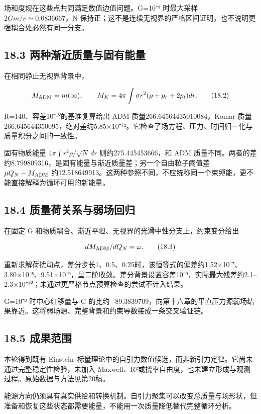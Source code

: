 \documentclass[UTF8,fontset=fandol,11pt]{ctexart}
\begin{document}
场和度规在这些点共同满足数值边值问题。G=10⁻³ 时最大采样 \(2Gm/r\simeq0.0836667\)，N 保持正；这不是连续无视界的严格区间证明，也不说明更强耦合处必然有同一分支。

\subsection*{18.3 两种渐近质量与固有能量}

在相同静止无视界背景中，

\[
M_{\rm ADM}=m(\infty),\qquad
M_K=4\pi\int\sigma r^2(\rho+p_r+2p_t)dr.
\tag{18.2}
\]

R=140、容差10⁻¹⁰的基准复算给出 ADM 质量266.64564435010084，Komar 质量266.645644350095，绝对差约5.85×10⁻¹²。它检查了场方程、压力、时间归一化与质量积分之间的一致性。

固有物质能量 \(4\pi\int r^2\rho/\sqrt N\,dr\) 则约275.445453666，和 ADM 质量不同。两者的差约8.799809316，是固有能量与渐近质量差；另一个自由粒子阈值差 \(\mu Q_N-M_{\rm ADM}\) 约12.518649913。这两种参照不同，不应统称同一个束缚能，更不能直接解释为循环可用的新能量。

\subsection*{18.4 质量荷关系与弱场回归}

在固定 G 和物质耦合、渐近平坦、无视界的光滑中性分支上，约束变分给出

\[
dM_{\rm ADM}/dQ_N=\omega.
\tag{18.3}
\]

重新求解荷扰动点，差分步长1、0.5、0.25时，该恒等式的偏差约1.52×10⁻⁷、3.80×10⁻⁸、9.51×10⁻⁹，呈二阶收敛。差分背景设置容差10⁻⁹，实际最大残差约2.1–2.3×10⁻¹⁰；未通过更严格节点预算检查的尝试不计入结果。

G=10⁻⁸ 时中心红移量与 G 的比约−89.3839709，向第十六章的平直压力源弱场结果靠近。这将弱场源、完整背景和约束导数接成一条交叉验证链。

\subsection*{18.5 成果范围}

本轮得到既有 Einstein–标量理论中的自引力数值候选，而非新引力定律。它尚未通过完整稳定性检验，未加入 Maxwell、R²或挠率自由度，也未建立形成与观测过程。原始数据与方法见第20稿。

能源方向仍须具有真实供给和转换机制。自引力聚集可以改变总质量与场形状，但准备和恢复这些状态都需要能量，不能用一次质量降低替代完整循环分析。
\end{document}
